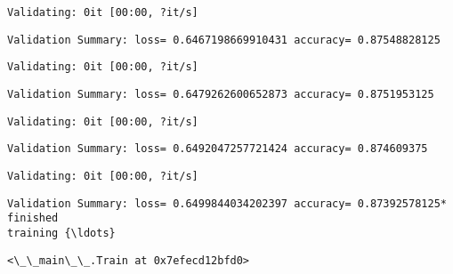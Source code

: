 \documentclass[11pt]{article}
\makeatletter
\newcommand{\boxspacing}{\kern\kvtcb@left@rule\kern\kvtcb@boxsep}
\newcommand{\prompt}[4]{
        {\ttfamily\llap{{\color{#2}[#3]:\hspace{3pt}#4}}\vspace{-\baselineskip}}
    }
\makeatother
\begin{document}
    
    \begin{Verbatim}[commandchars=\\\{\}]
Validating: 0it [00:00, ?it/s]
    \end{Verbatim}

    
    \begin{Verbatim}[commandchars=\\\{\}]
Validation Summary: loss= 0.6467198669910431 accuracy= 0.87548828125
    \end{Verbatim}

    
    \begin{Verbatim}[commandchars=\\\{\}]
Validating: 0it [00:00, ?it/s]
    \end{Verbatim}

    
    \begin{Verbatim}[commandchars=\\\{\}]
Validation Summary: loss= 0.6479262600652873 accuracy= 0.8751953125
    \end{Verbatim}

    
    \begin{Verbatim}[commandchars=\\\{\}]
Validating: 0it [00:00, ?it/s]
    \end{Verbatim}

    
    \begin{Verbatim}[commandchars=\\\{\}]
Validation Summary: loss= 0.6492047257721424 accuracy= 0.874609375
    \end{Verbatim}

    
    \begin{Verbatim}[commandchars=\\\{\}]
Validating: 0it [00:00, ?it/s]
    \end{Verbatim}

    
    \begin{Verbatim}[commandchars=\\\{\}]
Validation Summary: loss= 0.6499844034202397 accuracy= 0.87392578125* finished
training {\ldots}
    \end{Verbatim}

            \begin{tcolorbox}[breakable, size=fbox, boxrule=.5pt, pad at break*=1mm, opacityfill=0]
\prompt{Out}{outcolor}{6}{\boxspacing}
\begin{Verbatim}[commandchars=\\\{\}]
<\_\_main\_\_.Train at 0x7efecd12bfd0>
\end{Verbatim}
\end{tcolorbox}
        
\end{document}
